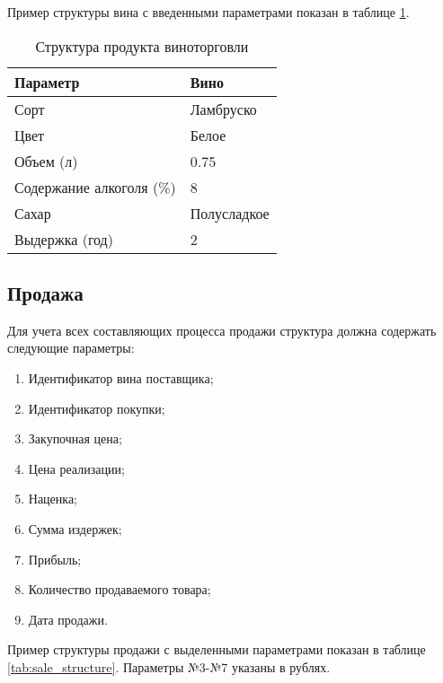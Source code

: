 Пример структуры вина с введенными параметрами показан в таблице \ref{tab:wine_structure}.

\begin{table}[h]
    \caption{Структура продукта виноторговли}
    \begin{center}
        \begin{tabular}{|l|l|}
            \hline
            \textbf{Параметр} & \textbf{Вино} \\ \hline
            Сорт & Ламбруско \\ \hline
            Цвет & Белое \\ \hline
            Объем (л) & 0.75 \\ \hline
            Содержание алкоголя (\%) & 8 \\ \hline
            Сахар & Полусладкое \\ \hline
            Выдержка (год) & 2 \\ \hline
        \end{tabular}
    \end{center}
    \label{tab:wine_structure}
\end{table}

\subsection{Продажа}

Для учета всех составляющих процесса продажи структура должна содержать следующие параметры:

\begin{enumerate}
	\item Идентификатор вина поставщика;
	\item Идентификатор покупки;
	\item Закупочная цена;
	\item Цена реализации;
	\item Наценка;
	\item Сумма издержек;
	\item Прибыль;
	\item Количество продаваемого товара;
	\item Дата продажи.
\end{enumerate}

Пример структуры продажи с выделенными параметрами показан в таблице \ref{tab:sale_structure}. Параметры №3-№7 указаны в рублях.

